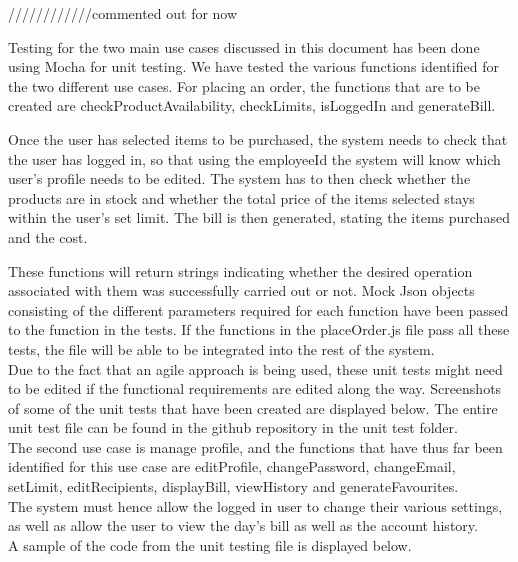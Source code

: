 \documentclass[a4paper,12pt]{article}
\begin{document}
////////////commented out for now 

Testing for the two main use cases discussed in this document has been done using Mocha for unit testing. We have tested the various functions identified for the two different use cases. For placing an order, the functions that are to be created are checkProductAvailability, checkLimits, isLoggedIn and generateBill. 

Once the user has selected items to be purchased, the system needs to check that the user has logged in, so that using the employeeId the system will know which user's profile needs to be edited. The system has to then check whether the products are in stock and whether the total price of the items selected stays within the user's set limit. The bill is then generated, stating the items purchased and the cost.

These functions will return strings indicating whether the desired operation associated with them was successfully carried out or not. Mock Json objects consisting of the different parameters required for each function have been passed to the function in the tests. If the functions in the placeOrder.js file pass all these tests, the file will be able to be integrated into the rest of the system. 
\\
Due to the fact that an agile approach is being used, these unit tests might need to be edited if the functional requirements are edited along the way. Screenshots of some of the unit tests that have been created are displayed below. The entire unit test file can be found in the github repository in the unit test folder.  
\\
The second use case is manage profile, and the functions that have thus far been identified for this use case are editProfile, changePassword, changeEmail, setLimit, editRecipients, displayBill, viewHistory and generateFavourites. 
\\
The system must hence allow the logged in user to change their various settings, as well as allow the user to view the day's bill as well as the account history.
\\
A sample of the code from the unit testing file is displayed below.

 
 
\end{document}
